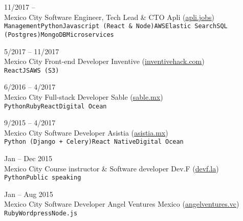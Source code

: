 \documentclass[9pt]{developercv} %
\begin{document}
\begin{entrylist}
    \entry
        {
            11/2017 --
            \\\footnotesize{Mexico City}
        }
        {Software Engineer, Tech Lead \& CTO}
        {Apli ({\href{https://apli.jobs/}{\underline{apli.jobs}}})}
        {\lorem \lorem\\ \texttt{Management}\slashsep\texttt{Python}\slashsep\texttt{Javascript (React \& Node)}\slashsep\texttt{AWS}\slashsep\texttt{Elastic Search}\slashsep\texttt{SQL (Postgres)}\slashsep\texttt{MongoDB}\slashsep\texttt{Microservices}}

    \entry
        {
            5/2017 -- 11/2017
            \\\footnotesize{Mexico City}
        }
        {Front-end Developer}
        {Inventive ({\href{https://www.linkedin.com/company/inventivehack/}{\underline{inventivehack.com}}})}
        {\lorem \lorem\\ \texttt{ReactJS}\slashsep\texttt{AWS (S3)}}

    \entry
        {
            6/2016 -- 4/2017
            \\\footnotesize{Mexico City}
        }
        {Full-stack Developer}
        {Sable ({\href{https://sable.mx/}{\underline{sable.mx}}})}
        {\lorem \lorem \lorem\\ \texttt{Python}\slashsep\texttt{Ruby}\slashsep\texttt{React}\slashsep\texttt{Digital Ocean}}

    \entry
        {
            9/2015 -- 4/2017
            \\\footnotesize{Mexico City}
        }
        {Software Developer}
        {Asistia ({\href{https://www.linkedin.com/company/asistia/}{\underline{asistia.mx}}})}
        {\lorem \lorem \lorem\\ \texttt{Python (Django + Celery)}\slashsep\texttt{React Native}\slashsep\texttt{Digital Ocean}}

    \entry
        {
            Jan -- Dec 2015
            \\\footnotesize{Mexico City}
        }
        {Course instructor \& Software developer}
        {Dev.F ({\href{https://devf.la/}{\underline{devf.la}}})}
        {\lorem \lorem \lorem\\ \texttt{Python}\slashsep\texttt{Public speaking}}

    \entry
        {
            Jan -- Aug 2015
            \\\footnotesize{Mexico City}
        }
        {Software Developer}
        {Angel Ventures Mexico ({\href{http://www.angelventures.vc/}{\underline{angelventures.vc}}})}
        {\lorem \lorem \lorem\\ \texttt{Ruby}\slashsep\texttt{Wordpress}\slashsep\texttt{Node.js}}

\end{entrylist}
\end{document}
